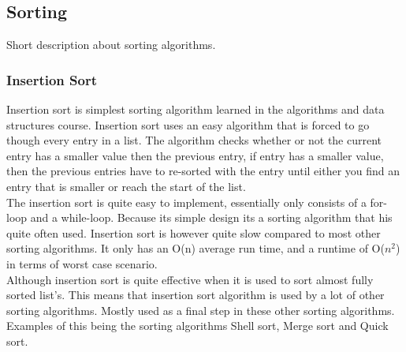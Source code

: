 \subsection{Sorting}
Short description about sorting algorithms.

\subsubsection{Insertion Sort}
Insertion sort is simplest sorting algorithm learned in the algorithms and data structures course. Insertion sort uses an easy algorithm that is forced to go though every entry in a list. The algorithm checks whether or not the current entry has a smaller value then the previous entry, if entry has a smaller value, then the previous entries have to re-sorted with the entry until either you find an entry that is smaller or reach the start of the list. 
\\The insertion sort is quite easy to implement, essentially only consists of a for-loop and a while-loop. Because its simple design its a sorting algorithm that his quite often used. Insertion sort is however quite slow compared to most other sorting algorithms. It only has an O(n) average run time, and a runtime of O($n^2$) in terms of worst case scenario.
\\Although insertion sort is quite effective when it is used to sort almost fully sorted list's. This means that insertion sort algorithm is used by a lot of other sorting algorithms. Mostly used as a final step in these other sorting algorithms. Examples of this being the sorting algorithms Shell sort, Merge sort and Quick sort.	%
